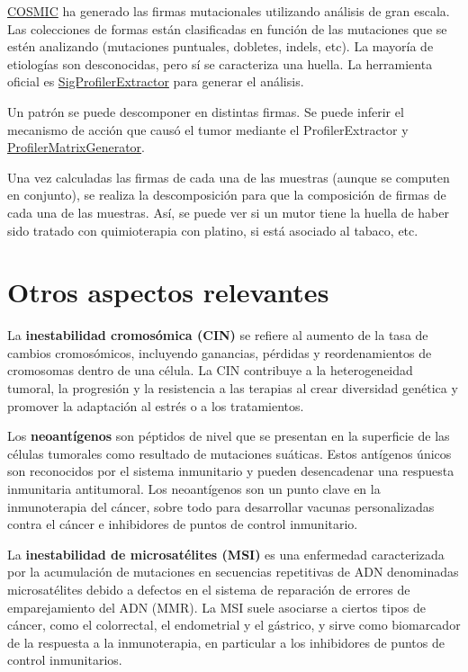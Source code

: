 \href{https://cancer.sanger.ac.uk/signatures/}{COSMIC} ha generado las firmas mutacionales utilizando análisis de gran escala. Las colecciones de formas están clasificadas en función de las mutaciones que se estén analizando (mutaciones puntuales, dobletes, indels, etc). La mayoría de etiologías son desconocidas, pero sí se caracteriza una huella. La herramienta oficial es \href{https://github.com/AlexandrovLab/SigProfilerExtractor}{SigProfilerExtractor} para generar el análisis.


Un patrón se puede descomponer en distintas firmas. Se puede inferir el mecanismo de acción que causó el tumor mediante el ProfilerExtractor y \href{https://github.com/AlexandrovLab/SigProfilerMatrixGenerator}{ProfilerMatrixGenerator}. 

Una vez calculadas las firmas de cada una de las muestras (aunque se computen en conjunto), se realiza la descomposición para que la composición de firmas de cada una de las muestras. Así, se puede ver si un mutor tiene la huella de haber sido tratado con quimioterapia con platino, si está asociado al tabaco, etc. 


\section{Otros aspectos relevantes}
La \textbf{inestabilidad cromosómica (CIN)} se refiere al aumento de la tasa de cambios cromosómicos, incluyendo ganancias, pérdidas y reordenamientos de cromosomas dentro de una célula. La CIN contribuye a la heterogeneidad tumoral, la progresión y la resistencia a las terapias al crear diversidad genética y promover la adaptación al estrés o a los tratamientos.

Los \textbf{neoantígenos} son péptidos de nivel que se presentan en la superficie de las células tumorales como resultado de mutaciones suáticas. Estos antígenos únicos son reconocidos por el sistema inmunitario y pueden desencadenar una respuesta inmunitaria antitumoral. Los neoantígenos son un punto clave en la inmunoterapia del cáncer, sobre todo para desarrollar vacunas personalizadas contra el cáncer e inhibidores de puntos de control inmunitario.

La \textbf{inestabilidad de microsatélites (MSI)} es una enfermedad caracterizada por la acumulación de mutaciones en secuencias repetitivas de ADN denominadas microsatélites debido a defectos en el sistema de reparación de errores de emparejamiento del ADN (MMR). La MSI suele asociarse a ciertos tipos de cáncer, como el colorrectal, el endometrial y el gástrico, y sirve como biomarcador de la respuesta a la inmunoterapia, en particular a los inhibidores de puntos de control inmunitarios.

